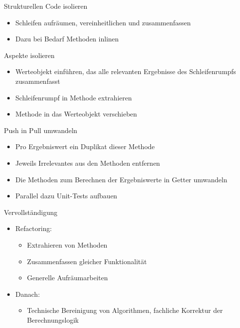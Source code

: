 \begin{frame}[fragile]{Strukturellen Code isolieren}
\begin{itemize}
\item Schleifen aufräumen, vereinheitlichen und zusammenfassen
\item Dazu bei Bedarf Methoden inlinen
\end{itemize}
\end{frame}

\begin{frame}[fragile]{Aspekte isolieren}
\begin{itemize}
\item Werteobjekt einführen, das alle relevanten Ergebnisse des Schleifenrumpfs zusammenfasst
\item Schleifenrumpf in Methode extrahieren
\item Methode in das Werteobjekt verschieben
\end{itemize}
\end{frame}

\begin{frame}[fragile]{Push in Pull umwandeln}
\begin{itemize}
\item Pro Ergebniswert ein Duplikat dieser Methode
\item Jeweils Irrelevantes aus den Methoden entfernen
\item Die Methoden zum Berechnen der Ergebniswerte in Getter umwandeln
\item Parallel dazu Unit-Tests aufbauen
\end{itemize}
\end{frame}

\begin{frame}[fragile]{Vervollständigung}

\begin{itemize}
\item Refactoring: 
\begin{itemize}
\item Extrahieren von Methoden
\item Zusammenfassen gleicher Funktionalität
\item Generelle Aufräumarbeiten
\end{itemize}
\end{itemize}

\begin{itemize}
\item Danach: 
\begin{itemize}
\item Technische Bereinigung von Algorithmen, fachliche Korrektur der Berechnungslogik
\end{itemize}
\end{itemize}

\end{frame}

